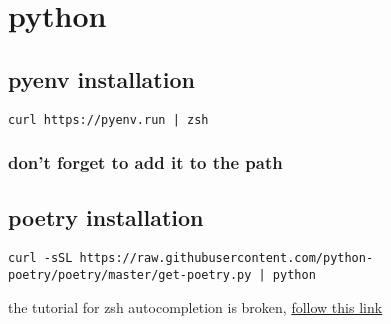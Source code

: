 \documentclass[11pt]{article}
\begin{document}
\section{python}
\label{sec:org3778dc8}
\subsection{pyenv installation}
\label{sec:orgd03c8b2}
\begin{verbatim}
curl https://pyenv.run | zsh
\end{verbatim}
\subsubsection{don't forget to add it to the path}
\label{sec:org5d6da8c}
\subsection{poetry installation}
\label{sec:org3a9b690}
\begin{verbatim}
curl -sSL https://raw.githubusercontent.com/python-poetry/poetry/master/get-poetry.py | python
\end{verbatim}
the tutorial for zsh autocompletion is broken, \href{https://github.com/python-poetry/poetry/issues/1734}{follow this link}\\
\end{document}
